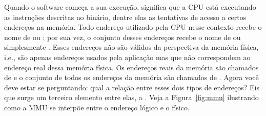 




Quando o software começa a sua execução, significa que a CPU está executando as
instruções descritas no binário, dentre elas as tentativas de acesso a certos
endereços na memória. Todo endereço utilizado pela CPU nesse contexto recebe o
nome de  ou ; por
sua vez, o conjunto desses endereços recebe o nome de  ou simplesmente . Esses
endereços não são válidos da perspectiva da memória física, i.e., são apenas
endereços usados pela aplicação mas que não correspondem ao endereço real dessa
memória física. Os endereços reais da memória são chamados de
 e o conjunto de todos os endereços da memória
são chamados de . Agora você deve
estar se perguntando: qual a relação entre esses dois tipos de endereços? Eis
que surge um terceiro elemento entre elas, a . Veja a Figura~\ref{fig:mmu} ilustrando como a MMU se interpõe
entre o endereço lógico e o físico.

